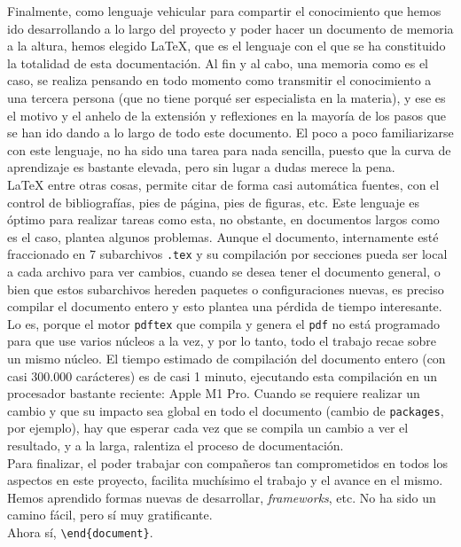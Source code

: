 \documentclass[../ei103948-project-documentation.tex]{subfiles}
\begin{document}
        Finalmente, como lenguaje vehicular para compartir el conocimiento que hemos ido desarrollando a lo largo del proyecto y poder hacer un documento de memoria a la altura, hemos elegido \LaTeX{}, que es el lenguaje con el que se ha constituido la totalidad de esta documentación. Al fin y al cabo, una memoria como es el caso, se realiza pensando en todo momento como transmitir el conocimiento a una tercera persona (que no tiene porqué ser especialista en la materia), y ese es el motivo y el anhelo de la extensión y reflexiones en la mayoría de los pasos que se han ido dando a lo largo de todo este documento. El poco a poco familiarizarse con este lenguaje, no ha sido una tarea para nada sencilla, puesto que la curva de aprendizaje es bastante elevada, pero sin lugar a dudas merece la pena.\\

        \LaTeX{} entre otras cosas, permite citar de forma casi automática fuentes, con el control de bibliografías, pies de página, pies de figuras, etc. Este lenguaje es óptimo para realizar tareas como esta, no obstante, en documentos largos como es el caso, plantea algunos problemas. Aunque el documento, internamente esté fraccionado en 7 subarchivos \texttt{.tex} y su compilación por secciones pueda ser local a cada archivo para ver cambios, cuando se desea tener el documento general, o bien que estos subarchivos hereden paquetes o configuraciones nuevas, es preciso compilar el documento entero y esto plantea una pérdida de tiempo interesante. Lo es, porque el motor \texttt{pdftex} que compila y genera el \texttt{pdf} no está programado para que use varios núcleos a la vez, y por lo tanto, todo el trabajo recae sobre un mismo núcleo. El tiempo estimado de compilación del documento entero (con casi 300.000 carácteres) es de casi 1 minuto, ejecutando esta compilación en un procesador bastante reciente: Apple M1 Pro. Cuando se requiere realizar un cambio y que su impacto sea global en todo el documento (cambio de \texttt{packages}, por ejemplo), hay que esperar cada vez que se compila un cambio a ver el resultado, y a la larga, ralentiza el proceso de documentación.\\

        Para finalizar, el poder trabajar con compañeros tan comprometidos en todos los aspectos en este proyecto, facilita muchísimo el trabajo y el avance en el mismo. Hemos aprendido formas nuevas de desarrollar, \textit{frameworks}, etc. No ha sido un camino fácil, pero sí muy gratificante.\\

        Ahora sí, \texttt{\textbackslash{}end\{document\}}.

    
\end{document}
